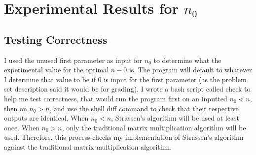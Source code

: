 \documentclass{article}
\begin{document}
\section*{Experimental Results for $n_0$}
\subsection*{Testing Correctness}
I used the unused first parameter as input for $n_0$ to determine what the experimental value for the optimal $n-0$ is. The program will default to whatever I determine that value to be if 0 is input for the first parameter (as the problem set description said it would be for grading). I wrote a bash script called check to help me test correctness, that would run the program first on an inputted $n_0 < n$, then on $n_0 > n$, and use the shell diff command to check that their respective outputs are identical. When $n_0 < n$, Strassen's algorithm will be used at least once. When $n_0 > n$, only the traditional matrix multiplication algorithm will be used. Therefore, this process checks my implementation of Strassen's algorithm against the traditional matrix multiplication algorithm. 
\end{document}
